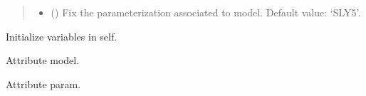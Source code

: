 \documentclass[letterpaper,10pt,english]{sphinxmanual}
\begin{document}
\begin{fulllineitems}
\begin{quote}
\begin{description}
\begin{itemize}
\item {} 
\sphinxAtStartPar
{} (\sphinxstyleliteralemphasis{\sphinxupquote{, }}) \textendash{} Fix the parameterization associated to model.     Default value: ‘SLY5’.

\end{itemize}

\end{description}\end{quote}

\sphinxAtStartPar
{}

\begin{fulllineitems}
\label{\detokenize{source/api/setup_eos_pheno_esym:nucleardatapy.eos.setup_pheno_esym.setupPhenoEsym.init_self}}
\pysigstartsignatures
{}
\pysigstopsignatures
\sphinxAtStartPar
Initialize variables in self.

\end{fulllineitems}


\begin{fulllineitems}
\label{\detokenize{source/api/setup_eos_pheno_esym:nucleardatapy.eos.setup_pheno_esym.setupPhenoEsym.model}}
\pysigstartsignatures
{}
\pysigstopsignatures
\sphinxAtStartPar
Attribute model.

\end{fulllineitems}


\begin{fulllineitems}
\label{\detokenize{source/api/setup_eos_pheno_esym:nucleardatapy.eos.setup_pheno_esym.setupPhenoEsym.param}}
\pysigstartsignatures
{}
\pysigstopsignatures
\sphinxAtStartPar
Attribute param.


\end{fulllineitems}
\end{fulllineitems}
\end{document}
